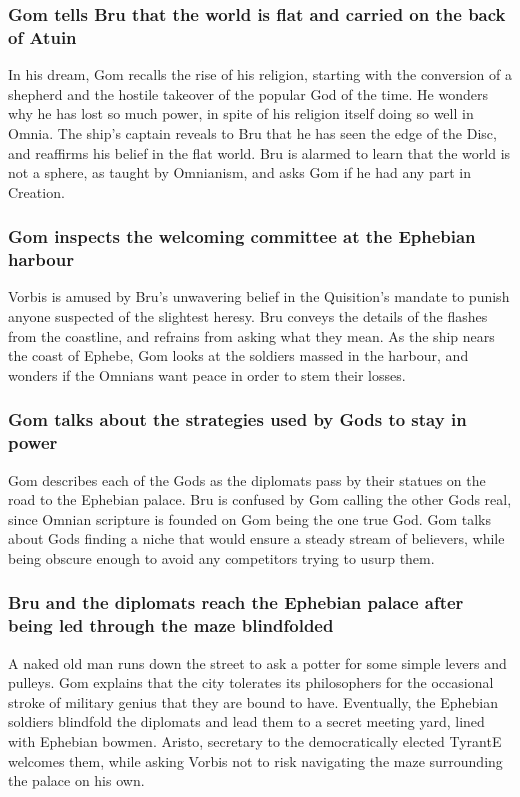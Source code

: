 \subsubsection{\Gls{Gom} tells \Gls{Bru} that the world is flat and carried on the back of
    \Gls{Atuin}}
In his dream, \Gls{Gom} recalls the rise of his religion, starting with the conversion of a shepherd
and the hostile takeover of the popular God of the time. He wonders why he has lost so much power,
in spite of his religion itself doing so well in Omnia. The ship's captain reveals to \Gls{Bru} that
he has seen the edge of the Disc, and reaffirms his belief in the flat world. \Gls{Bru} is alarmed
to learn that the world is not a sphere, as taught by Omnianism, and asks \Gls{Gom} if he had any
part in Creation.

\subsubsection{\Gls{Gom} inspects the welcoming committee at the Ephebian harbour}
\Gls{Vorbis} is amused by \Gls{Bru}'s unwavering belief in the Quisition's mandate to punish anyone
suspected of the slightest heresy. \Gls{Bru} conveys the details of the flashes from the coastline,
and refrains from asking what they mean. As the ship nears the coast of Ephebe, \Gls{Gom} looks at
the soldiers massed in the harbour, and wonders if the Omnians want peace in order to stem their
losses.

\subsubsection{\Gls{Gom} talks about the strategies used by Gods to stay in power}
\Gls{Gom} describes each of the Gods as the diplomats pass by their statues on the road to the
Ephebian palace. \Gls{Bru} is confused by \Gls{Gom} calling the other Gods real, since Omnian
scripture is founded on \Gls{Gom} being the one true God. \Gls{Gom} talks about Gods finding a niche
that would ensure a steady stream of believers, while being obscure enough to avoid any competitors
trying to usurp them.

\subsubsection{\Gls{Bru} and the diplomats reach the Ephebian palace after being led through the
    maze blindfolded}
A naked old man runs down the street to ask a potter for some simple levers and pulleys. \Gls{Gom}
explains that the city tolerates its philosophers for the occasional stroke of military genius that
they are bound to have. Eventually, the Ephebian soldiers blindfold the diplomats and lead them to a
secret meeting yard, lined with Ephebian bowmen. \Gls{Aristo}, secretary to the democratically
elected \Gls{TyrantE} welcomes them, while asking \Gls{Vorbis} not to risk navigating the maze
surrounding the palace on his own.

